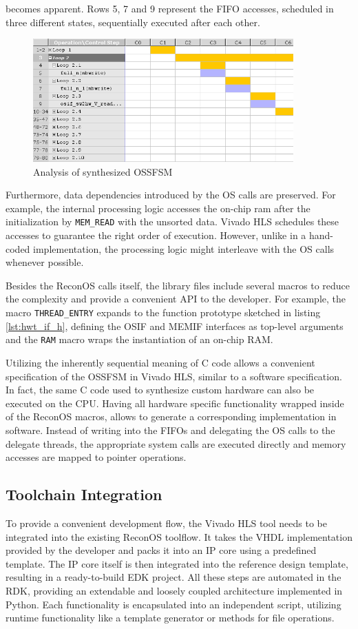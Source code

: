 becomes apparent. Rows 5, 7 and 9 represent the \ac{FIFO} accesses, scheduled
in three different states, sequentially executed after each other.
\begin{figure}[tb]
	\centering
	\includegraphics[width=10cm]{../figures/osfsm_a}
	\caption{Analysis of synthesized \acs{OSSFSM}}
	\label{fig:osfsm_a}
\end{figure}
Furthermore, data dependencies introduced by the \ac{OS} calls are preserved.
For example, the internal processing logic accesses the on-chip ram after the
initialization by \lstinline{MEM_READ} with the unsorted data. Vivado HLS
schedules these accesses to guarantee the right order of execution. However,
unlike in a hand-coded implementation, the processing logic might interleave
with the \ac{OS} calls whenever possible.

Besides the ReconOS calls itself, the library files include several macros to
reduce the complexity and provide a convenient \ac{API} to the developer. For
example, the macro \lstinline{THREAD_ENTRY} expands to the function prototype
sketched in listing \ref{lst:hwt_if_h}, defining the \ac{OSIF} and \ac{MEMIF}
interfaces as top-level arguments and the \lstinline{RAM} macro wraps the
instantiation of an on-chip \ac{RAM}.

Utilizing the inherently sequential meaning of C code allows a convenient
specification of the \ac{OSSFSM} in Vivado HLS, similar to a software
specification. In fact, the same C code used to synthesize custom hardware can
also be executed on the \ac{CPU}. Having all hardware specific functionality
wrapped inside of the ReconOS macros, allows to generate a corresponding
implementation in software. Instead of writing into the
\acp{FIFO} and delegating the \ac{OS} calls to the delegate threads, the
appropriate system calls are executed directly and memory accesses are mapped
to pointer operations.

\subsection{Toolchain Integration}
To provide a convenient development flow, the Vivado HLS tool needs to be
integrated into the existing ReconOS toolflow. It takes the \ac{VHDL}
implementation provided by the developer and packs it into an \ac{IP} core
using a predefined template. The \ac{IP} core itself is then integrated into
the reference design template, resulting in a ready-to-build EDK project. All
these steps are automated in the \ac{RDK}, providing an extendable and loosely
coupled architecture implemented in Python. Each functionality is encapsulated
into an independent script, utilizing runtime functionality like a template
generator or methods for file operations.

